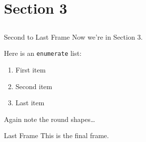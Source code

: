 
\section{Section 3}
\subsection*{}

\begin{frame}{Second to Last Frame}
    Now we're in Section 3.

    Here is an \texttt{enumerate} list:
    \begin{enumerate}
        \item
        First item

        \item
        Second item

        \item
        Last item
    \end{enumerate}
    Again note the round shapes\dots
\end{frame}

\begin{frame}{Last Frame}
    This is the final frame.
\end{frame}



\thanksframe
